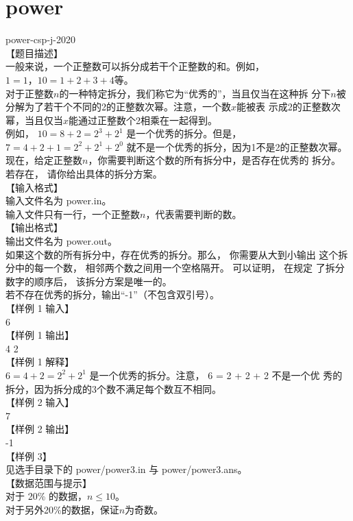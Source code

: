 \documentclass[12pt,twiside,a4paper]{ctexbook}
\numberwithin{chapter}{part}
\begin{document}
\section{power}
power-csp-j-2020\\
【题目描述】\\
一般来说，一个正整数可以拆分成若干个正整数的和。例如， $1 = 1， 10 =
1 + 2 + 3 + 4 $等。\\
对于正整数$n$的一种特定拆分，我们称它为“优秀的”，当且仅当在这种拆
分下$n$被分解为了若干个不同的2的正整数次幂。注意，一个数$x$能被表
示成2的正整数次幂，当且仅当$x$能通过正整数个2相乘在一起得到。\\
例如， $10 = 8 + 2 = 2^3 + 2^1$ 是一个优秀的拆分。但是， $7 = 4 + 2 + 1 =
2^2 + 2^1 + 2^0$ 就不是一个优秀的拆分，因为1不是2的正整数次幂。\\
现在，给定正整数$n$，你需要判断这个数的所有拆分中，是否存在优秀的
拆分。 若存在， 请你给出具体的拆分方案。\\
【输入格式】\\
输入文件名为 power.in。\\
输入文件只有一行，一个正整数$n$，代表需要判断的数。\\
【输出格式】\\
输出文件名为 power.out。\\
如果这个数的所有拆分中，存在优秀的拆分。那么， 你需要从大到小输出
这个拆分中的每一个数， 相邻两个数之间用一个空格隔开。 可以证明， 在规定
了拆分数字的顺序后， 该拆分方案是唯一的。\\
若不存在优秀的拆分，输出“-1”（不包含双引号）。\\
【样例 1 输入】\\
6\\
【样例 1 输出】\\
4 2\\
【样例 1 解释】\\
$6 = 4 + 2 = 2^2 + 2^1$ 是一个优秀的拆分。注意， 6 = 2 + 2 + 2 不是一个优
秀的拆分，因为拆分成的3个数不满足每个数互不相同。\\
【样例 2 输入】\\
7\\
【样例 2 输出】\\
-1\\
【样例 3】\\
见选手目录下的 power/power3.in 与 power/power3.ans。\\
【数据范围与提示】\\
对于 20\% 的数据，$n\leq 10$。\\
对于另外20\%的数据，保证$n$为奇数。\\
\end{document}
